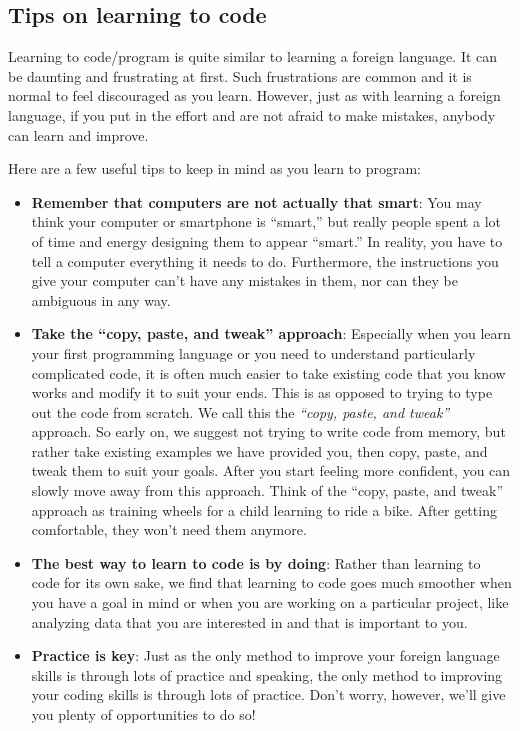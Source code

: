 \documentclass[]{book}
\providecommand{\tightlist}{%
  \setlength{\itemsep}{0pt}\setlength{\parskip}{0pt}}
\begin{document}
\hypertarget{tips-code}{%
\subsection{Tips on learning to code}\label{tips-code}}

Learning to code/program is quite similar to learning a foreign language. It can be daunting and frustrating at first. Such frustrations are common and it is normal to feel discouraged as you learn. However, just as with learning a foreign language, if you put in the effort and are not afraid to make mistakes, anybody can learn and improve.

Here are a few useful tips to keep in mind as you learn to program:

\begin{itemize}
\tightlist
\item
  \textbf{Remember that computers are not actually that smart}: You may think your computer or smartphone is ``smart,'' but really people spent a lot of time and energy designing them to appear ``smart.'' In reality, you have to tell a computer everything it needs to do. Furthermore, the instructions you give your computer can't have any mistakes in them, nor can they be ambiguous in any way.
\item
  \textbf{Take the ``copy, paste, and tweak'' approach}: Especially when you learn your first programming language or you need to understand particularly complicated code, it is often much easier to take existing code that you know works and modify it to suit your ends. This is as opposed to trying to type out the code from scratch. We call this the \emph{``copy, paste, and tweak''} approach. So early on, we suggest not trying to write code from memory, but rather take existing examples we have provided you, then copy, paste, and tweak them to suit your goals. After you start feeling more confident, you can slowly move away from this approach. Think of the ``copy, paste, and tweak'' approach as training wheels for a child learning to ride a bike. After getting comfortable, they won't need them anymore.
\item
  \textbf{The best way to learn to code is by doing}: Rather than learning to code for its own sake, we find that learning to code goes much smoother when you have a goal in mind or when you are working on a particular project, like analyzing data that you are interested in and that is important to you.
\item
  \textbf{Practice is key}: Just as the only method to improve your foreign language skills is through lots of practice and speaking, the only method to improving your coding skills is through lots of practice. Don't worry, however, we'll give you plenty of opportunities to do so!
\end{itemize}
\end{document}

